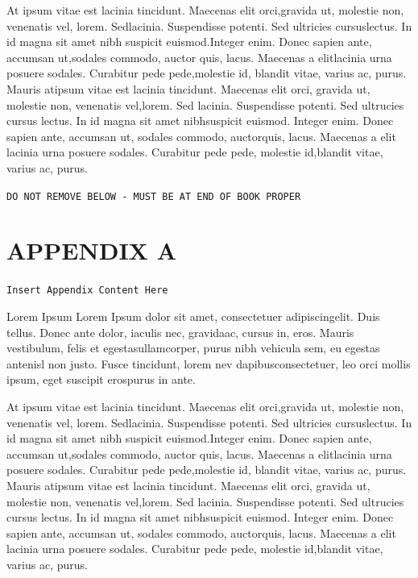 \documentclass[openleft,oneside,showtrims]{memoir}
\begin{document}
At ipsum vitae est lacinia tincidunt. Maecenas elit orci,gravida ut, molestie non, venenatis vel, lorem. Sedlacinia. Suspendisse potenti. Sed ultricies cursuslectus. In id magna sit amet nibh suspicit euismod.Integer enim. Donec sapien ante, accumsan ut,sodales commodo, auctor quis, lacus. Maecenas a elitlacinia urna posuere sodales. Curabitur pede pede,molestie id, blandit vitae, varius ac, purus. Mauris atipsum vitae est lacinia tincidunt. Maecenas elit orci, gravida ut, molestie non, venenatis vel,lorem. Sed lacinia. Suspendisse potenti. Sed ultrucies cursus lectus. In id magna sit amet nibhsuspicit euismod. Integer enim. Donec sapien ante, accumsan ut, sodales commodo, auctorquis, lacus. Maecenas a elit lacinia urna posuere sodales. Curabitur pede pede, molestie id,blandit vitae, varius ac, purus.



\texttt{DO NOT REMOVE BELOW - MUST BE AT END OF BOOK PROPER}

\backmatter
\appendix

\chapter{APPENDIX A}
\label{sec:orgd3d5c97}

\texttt{Insert Appendix Content Here}

Lorem Ipsum Lorem Ipsum dolor sit amet, consectetuer adipiscingelit. Duis tellus. Donec ante dolor, iaculis nec, gravidaac, cursus in, eros. Mauris vestibulum, felis et egestasullamcorper, purus nibh vehicula sem, eu egestas antenisl non justo. Fusce tincidunt, lorem nev dapibusconsectetuer, leo orci mollis ipsum, eget suscipit erospurus in ante.

At ipsum vitae est lacinia tincidunt. Maecenas elit orci,gravida ut, molestie non, venenatis vel, lorem. Sedlacinia. Suspendisse potenti. Sed ultricies cursuslectus. In id magna sit amet nibh suspicit euismod.Integer enim. Donec sapien ante, accumsan ut,sodales commodo, auctor quis, lacus. Maecenas a elitlacinia urna posuere sodales. Curabitur pede pede,molestie id, blandit vitae, varius ac, purus. Mauris atipsum vitae est lacinia tincidunt. Maecenas elit orci, gravida ut, molestie non, venenatis vel,lorem. Sed lacinia. Suspendisse potenti. Sed ultrucies cursus lectus. In id magna sit amet nibhsuspicit euismod. Integer enim. Donec sapien ante, accumsan ut, sodales commodo, auctorquis, lacus. Maecenas a elit lacinia urna posuere sodales. Curabitur pede pede, molestie id,blandit vitae, varius ac, purus.
\end{document}
